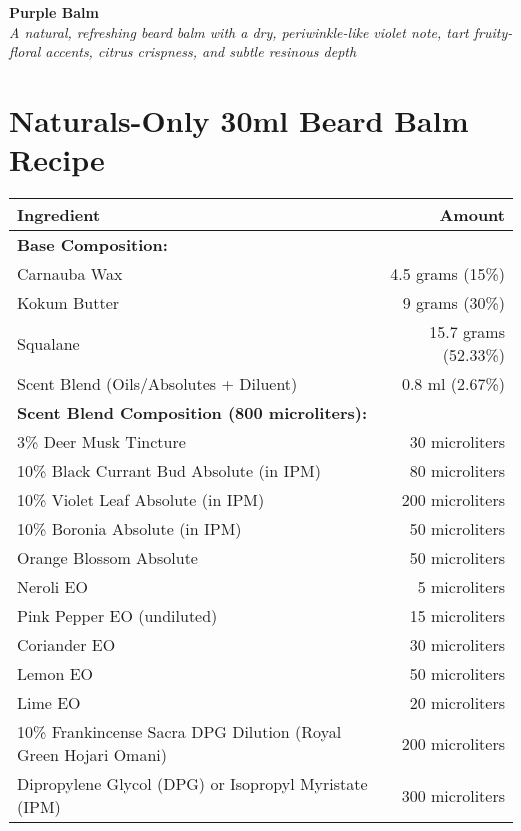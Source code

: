 \documentclass{article}
\begin{document}
\begin{center}
\textcolor{violetPurple}{\LARGE\textbf{Purple Balm}}\\[0.5cm]
\textcolor{colaBrown}{\large\textit{A natural, refreshing beard balm with a dry, periwinkle-like violet note, tart fruity-floral accents, citrus crispness, and subtle resinous depth}}\\[0.5cm]
\end{center}

\section*{Naturals-Only 30ml Beard Balm Recipe}

\begin{center}
\begin{tabular}{p{6.5cm}r}
\toprule
\textcolor{colaRed}{\textbf{Ingredient}} & \textcolor{colaRed}{\textbf{Amount}} \\
\midrule
\multicolumn{2}{l}{\textcolor{violetPurple}{\textbf{Base Composition:}}} \\
\midrule
Carnauba Wax & 4.5 grams (15\%) \\
Kokum Butter & 9 grams (30\%) \\
Squalane & 15.7 grams (52.33\%) \\
Scent Blend (Oils/Absolutes + Diluent) & 0.8 ml (2.67\%) \\
\midrule
\multicolumn{2}{l}{\textcolor{violetPurple}{\textbf{Scent Blend Composition (800 microliters):}}} \\
\midrule
3\% Deer Musk Tincture & 30 microliters \\
10\% Black Currant Bud Absolute (in IPM) & 80 microliters \\
10\% Violet Leaf Absolute (in IPM) & 200 microliters \\
10\% Boronia Absolute (in IPM) & 50 microliters \\
Orange Blossom Absolute & 50 microliters \\
Neroli EO & 5 microliters \\
Pink Pepper EO (undiluted) & 15 microliters \\
Coriander EO & 30 microliters \\
Lemon EO & 50 microliters \\
Lime EO & 20 microliters \\
10\% Frankincense Sacra DPG Dilution (Royal Green Hojari Omani) & 200 microliters \\
Dipropylene Glycol (DPG) or Isopropyl Myristate (IPM) & 300 microliters \\
\bottomrule
\end{tabular}
\end{center}
\end{document}
